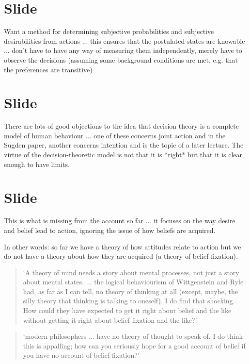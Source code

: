 \documentclass[12pt,\papersize]{extarticle}
\begin{document}
\section{Slide}
 Want a method for determining subjective probabilities and subjective desirabilities from actions ... this ensures that the postulated states are knowable ... don’t have to have any way of measuring them independently, merely have to observe the decisions (assuming some background conditions are met, e.g. that the preferences are transitive)

\section{Slide}
There are lots of good objections to the idea that decision theory is a complete model of human behaviour ... one of these concerns joint action and in the Sugden paper, another concerns intention and is the topic of a later lecture.
The virtue of the decision-theoretic model is not that it is *right* but that it is clear enough to have limits.


\section{Slide}
This is what is missing from the account so far ... it focuses on the way desire and belief lead to action, ignoring the issue of how beliefs are acquired.

In other words: so far we have a theory of how attitudes relate to action but we do not have a theory about how they are acquired (a theory of belief fixation).
\begin{quote}
`A theory of mind needs a story about mental processes, not just a story about mental states. ... the logical behaviourism of Wittgenstein and Ryle had, as far as I can tell, no theory of thinking at all (except, maybe, the silly theory that thinking is talking to oneself). I do find that shocking. How could they have expected to get it right about belief and the like without getting it right about belief fixation and the like?' \citep[p.\ 9--10]{Fodor:1998ap}
\end{quote}
\begin{quote}
`modern philosophers ... have no theory of thought to speak of. I do think this is appalling; how can you seriously hope for a good account of belief if you have no account of belief fixation?' 
\citep[p.\ 147]{Fodor:1987rt}
\end{quote}
\end{document}
